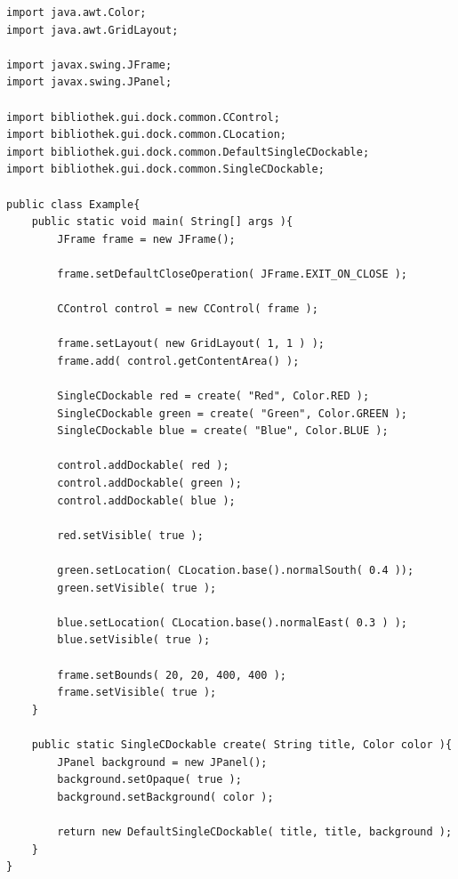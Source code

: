 \begin{lstlisting}
import java.awt.Color;
import java.awt.GridLayout;

import javax.swing.JFrame;
import javax.swing.JPanel;

import bibliothek.gui.dock.common.CControl;
import bibliothek.gui.dock.common.CLocation;
import bibliothek.gui.dock.common.DefaultSingleCDockable;
import bibliothek.gui.dock.common.SingleCDockable;

public class Example{
	public static void main( String[] args ){
		JFrame frame = new JFrame();
		
		frame.setDefaultCloseOperation( JFrame.EXIT_ON_CLOSE );
		
		CControl control = new CControl( frame );
		
		frame.setLayout( new GridLayout( 1, 1 ) );
		frame.add( control.getContentArea() );
		
		SingleCDockable red = create( "Red", Color.RED );
		SingleCDockable green = create( "Green", Color.GREEN );
		SingleCDockable blue = create( "Blue", Color.BLUE );
		
		control.addDockable( red );
		control.addDockable( green );
		control.addDockable( blue );
		
		red.setVisible( true );
		
		green.setLocation( CLocation.base().normalSouth( 0.4 ));
		green.setVisible( true );
		
		blue.setLocation( CLocation.base().normalEast( 0.3 ) );
		blue.setVisible( true );
		
		frame.setBounds( 20, 20, 400, 400 );
		frame.setVisible( true );
	}
	
	public static SingleCDockable create( String title, Color color ){
		JPanel background = new JPanel();
		background.setOpaque( true );
		background.setBackground( color );
		
		return new DefaultSingleCDockable( title, title, background );
	}
}

\end{lstlisting} 
